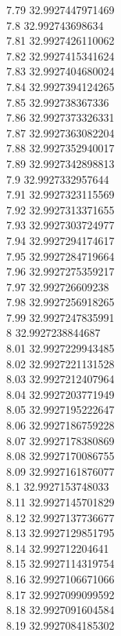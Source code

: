 {7.79	32.9927447971469\\
7.8	32.992743698634\\
7.81	32.9927426110062\\
7.82	32.9927415341624\\
7.83	32.9927404680024\\
7.84	32.9927394124265\\
7.85	32.992738367336\\
7.86	32.9927373326331\\
7.87	32.9927363082204\\
7.88	32.9927352940017\\
7.89	32.9927342898813\\
7.9	32.9927332957644\\
7.91	32.9927323115569\\
7.92	32.9927313371655\\
7.93	32.9927303724977\\
7.94	32.9927294174617\\
7.95	32.9927284719664\\
7.96	32.9927275359217\\
7.97	32.992726609238\\
7.98	32.9927256918265\\
7.99	32.9927247835991\\
8	32.9927238844687\\
8.01	32.9927229943485\\
8.02	32.9927221131528\\
8.03	32.9927212407964\\
8.04	32.9927203771949\\
8.05	32.9927195222647\\
8.06	32.9927186759228\\
8.07	32.9927178380869\\
8.08	32.9927170086755\\
8.09	32.9927161876077\\
8.1	32.9927153748033\\
8.11	32.9927145701829\\
8.12	32.9927137736677\\
8.13	32.9927129851795\\
8.14	32.992712204641\\
8.15	32.9927114319754\\
8.16	32.9927106671066\\
8.17	32.9927099099592\\
8.18	32.9927091604584\\
8.19	32.9927084185302\\
}
